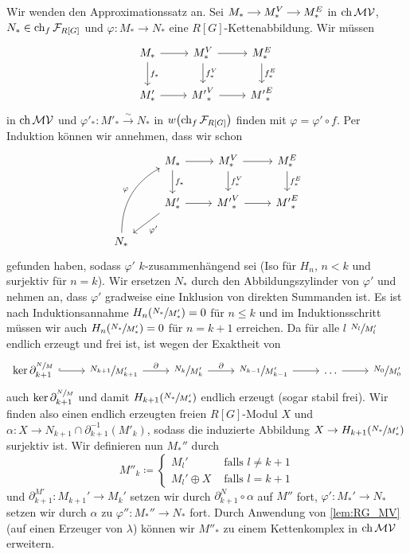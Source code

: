 \begin{beweis}
	Wir wenden den Approximationssatz an.
	Sei \(
		\begin{tikzcd}[cramped,sep=small]
			M_* \rar & M_*^V \rar & M_*^E
		\end{tikzcd}
	\) in $\operatorname{ch} \mathcal{MV}$, $N_* \in \operatorname{ch}_f \mathcal{F}_{R[G]}$ und $\varphi\colon M_* \to N_*$ eine $R[G]$-Kettenabbildung.
	Wir müssen
	\[
		\begin{tikzcd}
			M_* \rar  \dar["f_*"] & M_*^V \rar \dar["f_*^V"] & M_*^E \dar["f_*^E"] \\
			M'_* \rar & {M'}_*^V \rar & {M'}_*^E
		\end{tikzcd}
	\]
	in $\operatorname{ch} \mathcal{MV}$ und $\varphi'_* \colon M'_* \xrightarrow{\sim} N_*$ in $w \enbrace*{\ch_f \mathcal{F}_{R[G]}}$ finden mit $\varphi = \varphi' \circ f$.
	Per Induktion können wir annehmen, dass wir schon
	\[
		\begin{tikzcd}
			& M_* \rar  \dar["f_*"] & M_*^V \rar \dar["f_*^V"] & M_*^E \dar["f_*^E"] \\
			& M'_* \dlar["\varphi'"] \rar & {M'}_*^V \rar & {M'}_*^E \\
			N_* \ar[uur,bend left,"\varphi"]
		\end{tikzcd}
	\]
	gefunden haben, sodass $\varphi'$ $k$-zusammenhängend sei (Iso für $H_n$, $n < k$ und surjektiv für $n=k$).
	Wir ersetzen $N_*$ durch den Abbildungszylinder von $\varphi'$ und nehmen an, dass $\varphi'$ gradweise eine Inklusion von direkten Summanden ist.
	Es ist nach Induktionsannahme $H_n \enbrace*{\sfrac{N_*}{M'_*}}=0$ für $n \le k$ und im Induktionsschritt müssen wir auch $H_n \enbrace*{\sfrac{N_*}{M'_*}}=0$ für $n=k+1$ erreichen.
	Da für alle $l$ $\sfrac{N_l}{M'_l}$ endlich erzeugt und frei ist, ist wegen der Exaktheit von
	\[
		\begin{tikzcd}
			\ker \partial_{k+1}^{\sfrac{N}{M}} \rar[hook] & \sfrac{N_{k+1}}{M'_{k+1}} \rar["\partial"] & \sfrac{N_k}{M'_k} \rar["\partial"] & \sfrac{N_{k-1}}{M'_{k-1}} \rar & \ldots \rar & \sfrac{N_0}{M'_0}
		\end{tikzcd}
	\]
	auch $\ker \partial_{k+1}^{\sfrac{N}{M}}$ und damit $H_{k+1} \enbrace*{\sfrac{N_*}{M'_*}}$ endlich erzeugt (sogar stabil frei).
	Wir finden also einen endlich erzeugten freien $R[G]$-Modul $X$ und $\alpha \colon X \to N_{k+1} \cap \partial^{-1}_{k+1}(M'_k)$, sodass die induzierte Abbildung $X \to H_{k+1} \enbrace*{\sfrac{N_*}{M'_*}}$ surjektiv ist.
	Wir definieren nun $M_*''$ durch  
	\[
		M''_k \coloneqq \begin{cases}
			M_l' &\text{ falls } l \neq k+1\\
			M_l' \oplus X &\text{ falls } l=k+1
		\end{cases}
	\]
	und $\partial_{k+1}^{M'} \colon M_{k+1}' \to M_k'$  setzen wir durch $\partial^N_{k+1} \circ \alpha$ auf $M''$ fort, $\varphi' \colon M_*' \to N_*$ setzen wir durch $\alpha$ zu $\varphi'' \colon M_*'' \to N_*$ fort.
	Durch Anwendung von \autoref{lem:RG_MV} (auf einen Erzeuger von $\lambda$) können wir $M''_*$ zu einem Kettenkomplex in $\operatorname{ch} \mathcal{MV}$ erweitern.
	

\end{beweis}
